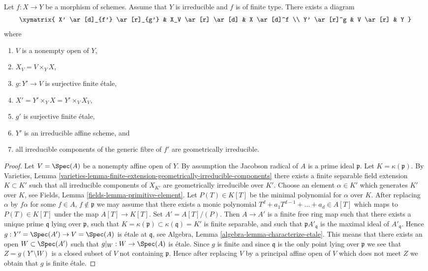 \begin{lemma}
\label{lemma-make-components-generic-fibre-geometrically-irreducible}
Let $f : X \to Y$ be a morphism of schemes.
Assume that $Y$ is irreducible and $f$ is of finite type.
There exists a diagram
$$
\xymatrix{
X' \ar[d]_{f'} \ar[r]_{g'} & X_V \ar[r] \ar[d] & X \ar[d]^f \\
Y' \ar[r]^g & V \ar[r] & Y
}
$$
where
\begin{enumerate}
\item $V$ is a nonempty open of $Y$,
\item $X_V = V \times_Y X$,
\item $g : Y' \to V$ is surjective finite \'etale,
\item $X' = Y' \times_Y X = Y' \times_V X_V$,
\item $g'$ is surjective finite \'etale,
\item $Y'$ is an irreducible affine scheme, and
\item all irreducible components of the generic fibre of $f'$
are geometrically irreducible.
\end{enumerate}
\end{lemma}

\begin{proof}
Let $V = \Spec(A)$ be a nonempty affine open of $Y$.
By assumption the Jacobson radical of $A$ is a prime ideal $\mathfrak p$.
Let $K = \kappa(\mathfrak p)$. By
Varieties, Lemma
\ref{varieties-lemma-finite-extension-geometrically-irreducible-components}
there exists a finite separable field extension
$K \subset K'$ such that all irreducible components of $X_{K'}$ are
geometrically irreducible over $K'$.
Choose an element $\alpha \in K'$ which generates $K'$ over
$K$, see
Fields, Lemma \ref{fields-lemma-primitive-element}.
Let $P(T) \in K[T]$ be the minimal polynomial for $\alpha$ over $K$.
After replacing $\alpha$ by $f \alpha$ for some
$f \in A$, $f \not \in \mathfrak p$
we may assume that there exists a monic polynomial
$T^d + a_1T^{d - 1} + \ldots + a_d \in A[T]$ which maps to
$P(T) \in K[T]$ under the map $A[T] \to K[T]$.
Set $A' = A[T]/(P)$. Then $A \to A'$ is a finite free ring map
such that there exists a unique prime $\mathfrak q$ lying over
$\mathfrak p$, such that
$K = \kappa(\mathfrak p) \subset \kappa(\mathfrak q) = K'$
is finite separable, and such that $\mathfrak pA'_{\mathfrak q}$
is the maximal ideal of $A'_{\mathfrak q}$.
Hence $g : Y' = \Spec(A') \to V = \Spec(A)$
is \'etale at $\mathfrak q$, see
Algebra, Lemma \ref{algebra-lemma-characterize-etale}.
This means that there exists an open $W \subset \Spec(A')$ such
that $g|_W : W \to \Spec(A)$ is \'etale.
Since $g$ is finite and since $\mathfrak q$ is the only point lying over
$\mathfrak p$ we see that $Z = g(Y' \setminus W)$ is a closed subset of $V$
not containing $\mathfrak p$. Hence after replacing $V$ by a principal
affine open of $V$ which does not meet $Z$ we obtain that $g$ is finite
\'etale.
\end{proof}







